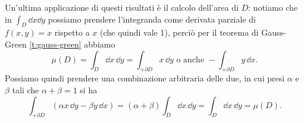 Un'ultima applicazione di questi risultati è il calcolo dell'area di $D$: notiamo che in $\int_D\dd x\dd y$ possiamo prendere l'integranda come derivata parziale di $f(x,y)=x$ rispetto a $x$ (che quindi vale 1), perciò per il teorema di Gauss-Green \ref{t:gauss-green} abbiamo
\begin{equation}
	\mu(D)=\int_D\dd x\,\dd y=\int_{+\partial D}x\,\dd y\text{ o anche }-\int_{+\partial D}y\,\dd x.
\end{equation}
Possiamo quindi prendere una combinazione arbitraria delle due, in cui presi $\alpha$ e $\beta$ tali che $\alpha+\beta=1$ si ha
\begin{equation}
	\int_{+\partial D}(\alpha x\,\dd y-\beta y\,\dd x)=(\alpha+\beta)\int_D\dd x\,\dd y=\int_D\dd x\,\dd y=\mu(D).
\end{equation}

